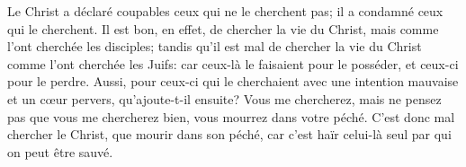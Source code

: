 Le Christ a déclaré coupables ceux qui ne le cherchent pas;
	il a condamné ceux qui le cherchent.
Il est bon, en effet, de chercher la vie du Christ,
	mais comme l’ont cherchée les disciples;
	tandis qu’il est mal de chercher la vie du Christ
		comme l’ont cherchée les Juifs:
	car ceux-là le faisaient pour le posséder,
	et ceux-ci pour le perdre.
Aussi, pour ceux-ci qui le cherchaient
	avec une intention mauvaise et un cœur pervers,
	qu’ajoute-t-il ensuite?
	Vous me chercherez, mais ne pensez pas que vous me chercherez bien,
	vous mourrez dans votre péché.
C’est donc mal chercher le Christ, que mourir dans son péché,
	car c’est haïr celui-là seul par qui on peut être sauvé.
